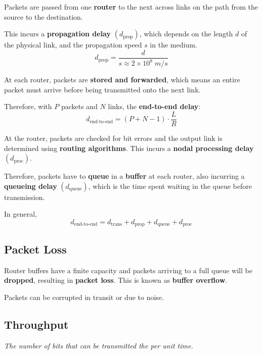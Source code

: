 Packets are passed from one \textbf{router} to the next across links on the path from the source to the destination.

This incurs a \textbf{propagation delay} $\left(d_{\text{prop}}\right)$, which depends on the length $d$ of the physical link,
and the propagation speed $s$ in the medium.\\
\begin{equation*}
    d_{\text{prop}} = \frac{d}{s \approx 2 \times 10^8 \; m/s}
\end{equation*}

At each router, packets are \textbf{stored and forwarded}, which means an entire packet must arrive before being
transmitted onto the next link.

Therefore, with $P$ packets and $N$ links, the \textbf{end-to-end delay}:\\
\begin{equation*}
    d_{\text{end-to-end}} = (P + N - 1) \cdot \frac{L}{R}
\end{equation*}

At the router, packets are checked for bit errors and the output link is determined using \textbf{routing algorithms}.
This incurs a \textbf{nodal processing delay} $\left(d_{\text{proc}}\right)$.

Therefore, packets have to \textbf{queue} in a \textbf{buffer} at each router,
also incurring a \textbf{queueing delay} $\left(d_{\text{queue}}\right)$, which is the time spent waiting in the
queue before transmission.

In general,\\
\begin{equation*}
    d_{\text{end-to-end}} = d_{\text{trans}} + d_{\text{prop}} + d_{\text{queue}} + d_{\text{proc}} 
\end{equation*}

\subsection{Packet Loss}
Router buffers have a finite capacity and packets arriving to a full queue will be \textbf{dropped},
resulting in \textbf{packet loss}.
This is known as \textbf{buffer overflow}.

Packets can be corrupted in transit or due to noise.

\subsection{Throughput}
\emph{The number of bits that can be transmitted the per unit time.}

